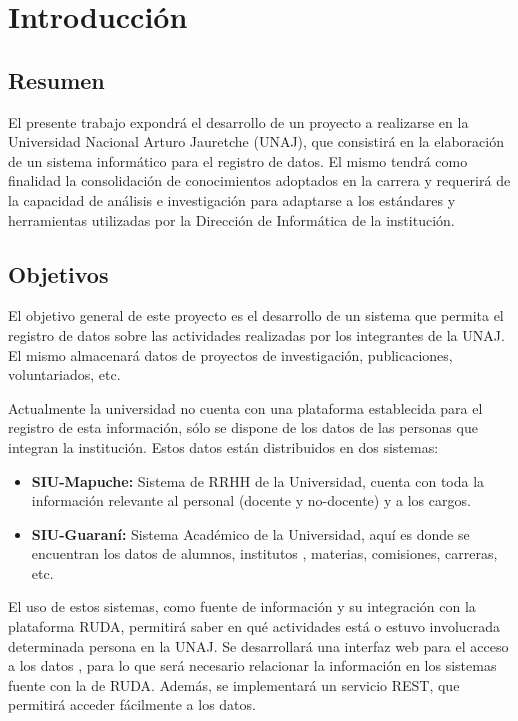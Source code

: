 
\section{Introducción}%
\label{sec:introduccion}

\subsection{Resumen}%
\label{sub:resumen}

El presente trabajo expondrá el desarrollo de un proyecto a realizarse en la Universidad Nacional Arturo Jauretche (UNAJ), que
consistirá en la elaboración de un sistema informático para el registro de datos\@. El mismo tendrá como finalidad la consolidación
de conocimientos adoptados en la carrera y requerirá de la capacidad de análisis e investigación para adaptarse a los estándares
y herramientas utilizadas por la Dirección de Informática de la institución.

\subsection{Objetivos}%
\label{sub:objetivos}


El objetivo general de este proyecto es el desarrollo de un sistema que permita el registro de datos sobre las actividades
realizadas por los integrantes de la UNAJ\@. El mismo almacenará datos de proyectos de investigación, publicaciones, voluntariados, etc.

Actualmente la universidad no cuenta con una plataforma establecida para el registro de esta información, sólo se dispone de
los datos de las personas que integran la institución. Estos datos están distribuidos en dos sistemas:
\begin{itemize}
    \item \textbf{SIU-Mapuche:} Sistema de RRHH de la Universidad, cuenta con toda la información relevante al personal (docente
        y no-docente) y a los cargos.
    \item \textbf{SIU-Guaraní:} Sistema Académico de la Universidad, aquí es donde se encuentran los datos de alumnos, institutos
        , materias, comisiones, carreras, etc.
\end{itemize}

El uso de estos sistemas, como fuente de información y su integración con la plataforma RUDA, permitirá saber en qué actividades
está o estuvo involucrada determinada persona en la UNAJ. Se desarrollará una interfaz web para el acceso a los datos
, para lo que será necesario relacionar la información en los sistemas fuente con la de RUDA\@. Además, se implementará
un servicio REST, que permitirá acceder fácilmente a los datos.

